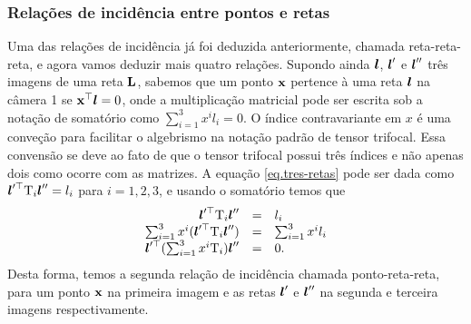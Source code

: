 \subsubsection{Relações de incidência entre pontos e retas}\label{sec.rela-incidi-tri}
Uma das relações de incidência já foi deduzida anteriormente, chamada reta-reta-reta, e agora vamos deduzir mais quatro relações. Supondo ainda $\boldsymbol{l}$, $\boldsymbol{l}'$ e $\boldsymbol{l}''$ três imagens de uma reta ${\bf L}$, sabemos que um ponto $\mathbf{x}$ pertence à uma reta $\boldsymbol{l}$ na câmera 1 se $\mathbf{x}^\top\boldsymbol{l}=0$, onde a multiplicação matricial pode ser escrita sob a notação de somatório como $\sum_{i=1}^{3}x^il_i=0$. O índice contravariante em $x$ é uma conveção para facilitar o algebrismo na notação padrão de tensor trifocal. Essa convensão se deve ao fato de que o tensor trifocal possui três índices e não apenas dois como ocorre com as matrizes. A equação \ref{eq.tres-retas} pode ser dada como $\boldsymbol{l}'^\top \mbox{T}_i\boldsymbol{l}''
=l_i$ para $i=1,2,3$, e usando o somatório temos que
\begin{equation*}
\begin{array}{rcl}
\boldsymbol{l}'^\top \mbox{T}_i\boldsymbol{l}''
&=&l_i\\
\sum_{i=1}^3 x^i(\boldsymbol{l}'^\top \mbox{T}_i\boldsymbol{l}'')&=&\sum_{i=1}^3 x^il_i\\
\boldsymbol{l}'^\top(\sum_{i=1}^3 x^i\mbox{T}_i)\boldsymbol{l}''&=&0.
\end{array}
\end{equation*}
Desta forma, temos a segunda relação de incidência chamada ponto-reta-reta, para um ponto $\mathbf{x}$ na primeira imagem e as retas $\boldsymbol{l}'$ e $\boldsymbol{l}''$ na segunda e terceira imagens respectivamente. 

